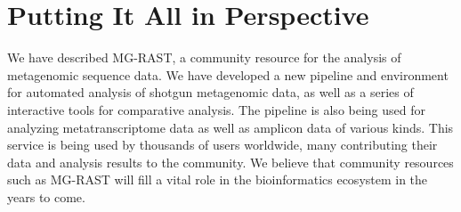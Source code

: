 \documentclass[12pt,fullpage]{report}
\begin{document}
%
%
%
%
%
%




\chapter{Putting It All in Perspective}

We have described MG-RAST, a community resource for the analysis of metagenomic sequence data. We have developed a new pipeline and environment for automated analysis of shotgun metagenomic data, as well as a series of interactive tools for comparative analysis. The pipeline is also being used for analyzing metatranscriptome data as well as amplicon data of various kinds. This service is being used by thousands of users worldwide, many contributing their data and analysis results to the community. We believe that community resources such as MG-RAST will fill a vital role in the bioinformatics ecosystem in the years to come.
\end{document}
